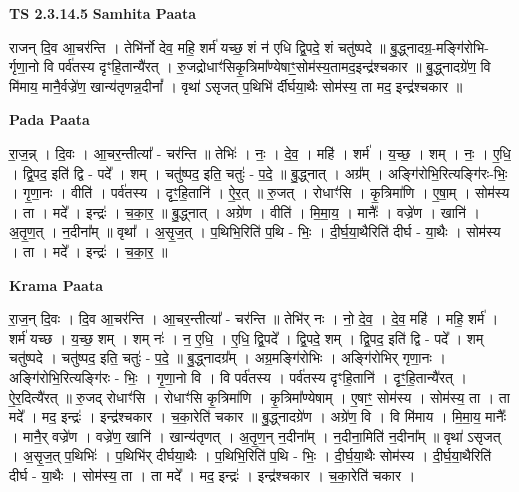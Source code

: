 \documentclass[17pt]{extarticle}
\begin{document}
\textbf{TS 2.3.14.5 } \newline
\textbf{Samhita Paata} \newline

राजन् दि॒व आ॒चर॑न्ति । तेभि॑र्नो देव॒ महि॒ शर्म॑ यच्छ॒ शं न॑ एधि द्वि॒पदे॒ शं चतु॑ष्पदे ॥ बु॒द्ध्नादग्र॒-मङ्गि॑रोभि-र्गृणा॒नो वि पर्व॑तस्य दृꣳहि॒तान्यै॑रत् । रु॒जद्रोधाꣳ॑सिकृ॒त्रिमा᳚ण्येषाꣳ॒॒सोम॑स्य॒तामद॒इन्द्र॑श्चकार ॥ बु॒द्ध्नादग्रे॑ण॒ वि मि॑माय॒ मानै॒र्वज्रे॑ण॒ खान्य॑तृणन्न॒दीनां᳚ । वृथा॑ ऽसृजत् प॒थिभि॑ र्दीर्घया॒थैः सोम॑स्य॒ ता मद॒ इन्द्र॑श्चकार ॥ \newline

\textbf{Pada Paata} \newline

रा॒ज॒न्न् । दि॒वः । आ॒चर॒न्तीत्या᳚ - चर॑न्ति ॥ तेभिः॑ । नः॒ । दे॒व॒ । महि॑ । शर्म॑ । य॒च्छ॒ । शम् । नः॒ । ए॒धि॒ । द्वि॒पद॒ इति॑ द्वि - पदे᳚ । शम् । चतु॑ष्पद॒ इति॒ चतुः॑ - प॒दे॒ ॥ बु॒द्ध्नात् । अग्र᳚म् । अङ्गि॑रोभि॒रित्यङ्गि॑रः-भिः॒ । गृ॒णा॒नः । वीति॑ । पर्व॑तस्य । दृꣳ॒॒हि॒तानि॑ । ऐ॒र॒त् ॥ रु॒जत् । रोधाꣳ॑सि । कृ॒त्रिमा॑णि । ए॒षा॒म् । सोम॑स्य । ता । मदे᳚ । इन्द्रः॑ । च॒का॒र॒ ॥ बु॒द्ध्नात् । अग्रे॑ण । वीति॑ । मि॒मा॒य॒ । मानैः᳚ । वज्रे॑ण । खानि॑ । अ॒तृ॒ण॒त् । न॒दीना᳚म् ॥ वृथा᳚ । अ॒सृ॒ज॒त् । प॒थिभि॒रिति॑ प॒थि - भिः॒ । दी॒र्घ॒या॒थैरिति॑ दीर्घ - या॒थैः । सोम॑स्य । ता । मदे᳚ । इन्द्रः॑ । च॒का॒र॒ ॥  \newline


\textbf{Krama Paata} \newline

रा॒ज॒न् दि॒वः । दि॒व आ॒चर॑न्ति । आ॒चर॒न्तीत्या᳚ - चर॑न्ति ॥ तेभि॑र् नः । नो॒ दे॒व॒ । दे॒व॒ महि॑ । महि॒ शर्म॑ । शर्म॑ यच्छ । य॒च्छ॒ शम् । शम् नः॑ । न॒ ए॒धि॒ । ए॒धि॒ द्वि॒पदे᳚ । द्वि॒पदे॒ शम् । द्वि॒पद॒ इति॑ द्वि - पदे᳚ । शम् चतु॑ष्पदे । चतु॑ष्पद॒ इति॒ चतुः॑ - प॒दे॒ ॥ बु॒द्ध्नादग्र᳚म् । अग्र॒मङ्गि॑रोभिः । अङ्गि॑रोभिर् गृणा॒नः । अङ्गि॑रोभि॒रित्यङ्गि॑रः - भिः॒ । गृ॒णा॒नो वि । वि पर्व॑तस्य । पर्व॑तस्य दृꣳहि॒तानि॑ । दृꣳ॒॒हि॒तान्यै॑रत् । ऐ॒र॒दित्यै॑रत् ॥ रु॒जद् रोधाꣳ॑सि । रोधाꣳ॑सि कृ॒त्रिमा॑णि । कृ॒त्रिमा᳚ण्येषाम् । ए॒षाꣳ॒॒ सोम॑स्य । सोम॑स्य॒ ता । ता मदे᳚ । मद॒ इन्द्रः॑ । इन्द्र॑श्चकार । च॒का॒रेति॑ चकार ॥ बु॒द्ध्नादग्रे॑ण । अग्रे॑ण॒ वि । वि मि॑माय । मि॒मा॒य॒ मानैः᳚ । मानै॒र् वज्रे॑ण । वज्रे॑ण॒ खानि॑ । खान्य॑तृणत् । अ॒तृ॒ण॒न् न॒दीना᳚म् । न॒दीना॒मिति॑ न॒दीना᳚म् ॥ वृथा॑ ऽसृजत् । अ॒सृ॒ज॒त् प॒थिभिः॑ । प॒थिभि॑र् दीर्घया॒थैः । प॒थिभि॒रिति॑ प॒थि - भिः॒ । दी॒र्घ॒या॒थैः सोम॑स्य । दी॒र्घ॒या॒थैरिति॑ दीर्घ - या॒थैः । सोम॑स्य॒ ता । ता मदे᳚ । मद॒ इन्द्रः॑ । इन्द्र॑श्चकार । च॒का॒रेति॑ चकार । \newline
\end{document}
